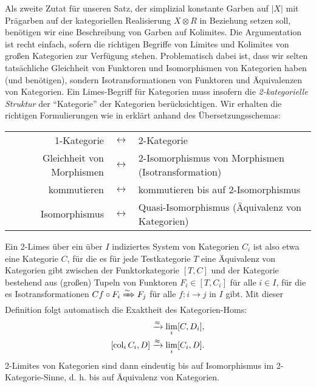 Als zweite Zutat für unseren Satz, der simplizial konstante Garben auf
$|X|$ mit Prägarben auf der kategoriellen Realisierung $X \otimes R$
in Beziehung setzen soll, benötigen wir eine Beschreibung von Garben
auf Kolimites. Die Argumentation ist recht einfach, sofern die
richtigen Begriffe von Limites und Kolimites von großen Kategorien zur
Verfügung stehen. Problematisch dabei ist, dass wir selten
tatsächliche Gleichheit von Funktoren und Isomorphismen von Kategorien
haben (und benötigen), sondern Isotransformationen von Funktoren und
Äquivalenzen von Kategorien. Ein Limes-Begriff für Kategorien muss
insofern die \emph{2-kategorielle Struktur} der ``Kategorie'' der
Kategorien berücksichtigen. Wir erhalten die richtigen Formulierungen
wie in \cite{nlab:2-limit} erklärt anhand des Übersetzungsschemas:
\renewcommand{\arraystretch}{1.5}
\begin{center}
    \begin{tabulary}{\textwidth}{RCL}
    1-Kategorie & $\leftrightarrow$
    & 2-Kategorie \\
    Gleichheit von Morphismen & $\leftrightarrow$
    & 2-Isomorphismus von Morphismen (Isotransformation) \\
    kommutieren & $\leftrightarrow$
    & kommutieren bis auf 2-Isomorphismus \\
    Isomorphismus & $\leftrightarrow$
    & Quasi-Isomorphismus (Äquivalenz von Kategorien)  
  \end{tabulary}
\end{center}
Ein 2-Limes über ein über $I$ indiziertes System von Kategorien $C_i$
ist also etwa eine Kategorie $C$, für die es für jede Testkategorie
$T$ eine Äquivalenz von Kategorien gibt zwischen der Funktorkategorie
$[T, C]$ und der Kategorie bestehend aus (großen) Tupeln von Funktoren
$F_i \in [T, C_i]$ für alle $i \in I$, für die es Isotransformationen
$Cf \circ F_i \xRightarrow{\sim} F_j$ für alle $f: i \to j$ in $I$ gibt. Mit
dieser Definition folgt automatisch die Exaktheit des Kategorien-Homs:
\begin{align*}
  [C, \lim_i D_i] &\qiso \lim_i [C, D_i], \\
  [\col_i C_i, D] &\qiso \lim_i [C_i, D].
\end{align*}
2-Limites von Kategorien sind dann eindeutig bis auf Isomorphismus im
2-Kategorie-Sinne, d. h. bis auf Äquivalenz von Kategorien.

